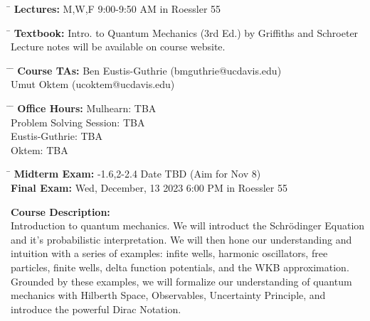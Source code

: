 \documentclass[12pt]{article}
\begin{document}
\noindent
\begin{tabbing}
\hspace*{8em} \= \kill 
\textbf {Lectures:} \> M,W,F 9:00-9:50 AM in Roessler 55 
\end{tabbing}
\noindent
\begin{tabbing}
\hspace*{8em} \= \kill 
\textbf{Textbook:} \> Intro. to Quantum Mechanics (3rd Ed.) by Griffiths and Schroeter \\
\> Lecture notes will be available on course website.
\end{tabbing}
\noindent
\begin{tabbing}
\hspace*{8em}\= \hspace*{14em} \= \kill 
\textbf{Course TAs:} \> Ben Eustis-Guthrie \> (bmguthrie@ucdavis.edu) \\
                     \> Umut Oktem \> (ucoktem@ucdavis.edu) 
\end{tabbing}
\noindent
\begin{tabbing}
\hspace*{8em}\= \hspace*{14em} \= \kill 
\textbf{Office Hours:}    \> Mulhearn: \> TBA \\
    \> Problem Solving Session: \> TBA \\
    \> Eustis-Guthrie: \> TBA \\
    \> Oktem: \> TBA \\
\end{tabbing}
\noindent
\begin{tabbing}
\hspace*{12em}\= \kill 
\textbf{Midterm Exam:} -1.6,2-2.4 Date TBD (Aim for Nov 8)\\
\textbf{Final Exam:} \> Wed, December, 13 2023 6:00 PM in Roessler 55
\end{tabbing}
\noindent
\textbf {Course Description:}\\
Introduction to quantum mechanics.  We will introduct the
Schr\"odinger Equation and it's probabilistic interpretation.  We will
then hone our understanding and intuition with a series of examples:
infite wells, harmonic oscillators, free particles, finite wells,
delta function potentials, and the WKB approximation.  Grounded by
these examples, we will formalize our understanding of quantum
mechanics with Hilberth Space, Observables, Uncertainty Principle, and
introduce the powerful Dirac Notation.\\ 
\end{document}
